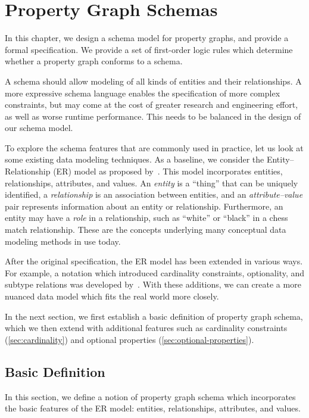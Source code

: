 \documentclass{report}
\theoremstyle{definition}
\begin{document}
\chapter{Property Graph Schemas}
\label{ch:pg-schema}

In this chapter, we design a schema model for property graphs, and provide a formal specification. We provide a set of first-order logic rules which determine whether a property graph conforms to a schema.

A schema should allow modeling of all kinds of entities and their relationships. A more expressive schema language enables the specification of more complex constraints, but may come at the cost of greater research and engineering effort, as well as worse runtime performance. This needs to be balanced in the design of our schema model.

To explore the schema features that are commonly used in practice, let us look at some existing data modeling techniques. As a baseline, we consider the Entity--Relationship (ER) model as proposed by~\citet{chen1976entity}. This model incorporates entities, relationships, attributes, and values. An \emph{entity} is a ``thing'' that can be uniquely identified, a \emph{relationship} is an association between entities, and an \emph{attribute--value} pair represents information about an entity or relationship. Furthermore, an entity may have a \emph{role} in a relationship, such as ``white'' or ``black'' in a chess match relationship. These are the concepts underlying many conceptual data modeling methods in use today.

After the original specification, the ER model has been extended in various ways. For example, a notation which introduced cardinality constraints, optionality, and subtype relations was developed by~\citet{barker1990entity}. With these additions, we can create a more nuanced data model which fits the real world more closely.

In the next section, we first establish a basic definition of property graph schema, which we then extend with additional features such as cardinality constraints (\autoref{sec:cardinality}) and optional properties (\autoref{sec:optional-properties}).

\section{Basic Definition}

In this section, we define a notion of property graph schema which incorporates the basic features of the ER model: entities, relationships, attributes, and values.
\end{document}
